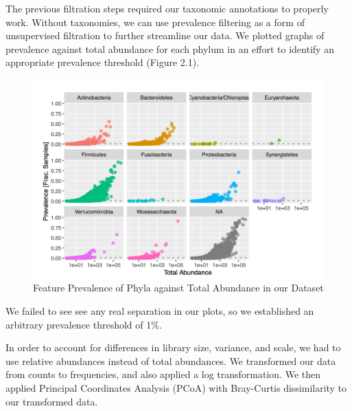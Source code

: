 \documentclass[12pt,twoside]{dukestatscithesis}
\begin{document}
The previous filtration steps required our taxonomic annotations to
properly work. Without taxonomies, we can use prevalence filtering as a
form of unsupervised filtration to further streamline our data. We
plotted graphs of prevalence against total abundance for each phylum in
an effort to identify an appropriate prevalence threshold (Figure 2.1).
\begin{figure}
\includegraphics[width=700px]{figure/figure3} \caption{Feature Prevalence of Phyla against Total Abundance in our Dataset}\label{fig:figure3}
\end{figure}
We failed to see see any real separation in our plots, so we established
an arbitrary prevalence threshold of 1\%.

In order to account for differences in library size, variance, and
scale, we had to use relative abundances instead of total abundances. We
transformed our data from counts to frequencies, and also applied a log
transformation. We then applied Principal Coordinates Analysis (PCoA)
with Bray-Curtis dissimilarity to our transformed data.
\end{document}
